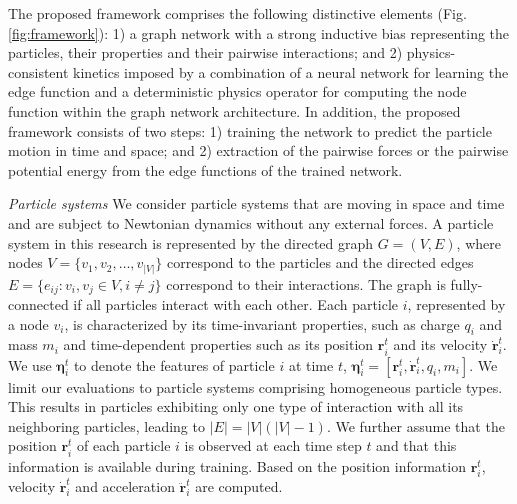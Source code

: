 \documentclass{article}
\begin{document}
The proposed framework comprises the following distinctive elements (Fig. \ref{fig:framework}): 1) a graph network with a strong inductive bias representing the particles, their properties and their pairwise interactions; and 2) physics-consistent kinetics imposed by a combination of a neural network for learning the edge function and a deterministic physics operator for computing the node function within the graph network architecture. In addition, the proposed framework consists of two steps: 1) training the network to predict the particle motion in time and space; and 2) extraction of the pairwise forces or the pairwise potential energy from the edge functions of the trained network. 

\textit{Particle systems} We consider particle systems that are moving in space and time and are subject to Newtonian dynamics without any external forces.  A particle system in this research is represented by the directed graph $G=(V, E)$, where nodes $V = \{v_1, v_2, \ldots, v_{|V|}\}$ correspond to the particles and the directed edges $E = \{e_{ij}: v_i, v_j \in V, i\neq j\} $ correspond to their interactions. {The graph is fully-connected if all particles interact with each other.} Each particle $i$, represented by a node $v_i$, is characterized by its time-invariant properties, such as charge $q_i$ and mass $m_i$ and time-dependent properties such as its position $\bm{r}_i^t$ and its velocity $\bm{\dot{r}}_i^t$. We use $\bm{\eta}_i^t$ to denote the features of particle $i$ at time $t$, $\bm{\eta}_i^t = [\bm{r}_i^t, \bm{\dot{r}}_i^t, q_i, m_i]$. We limit our evaluations to particle systems comprising homogeneous particle types. This results in particles exhibiting only one type of interaction with all its neighboring particles, leading to $|E| = |V| (|V| - 1)$. We further assume that the position $\bm{r}_i^t$ of each particle $i$  is observed at each time step $t$ and that this information is available during training. Based on the position information $\bm{r}_i^t$,  velocity $\bm{\dot{r}}_i^t$ and acceleration $\bm{\ddot{r}}_i^t$ are computed. 
\end{document}

